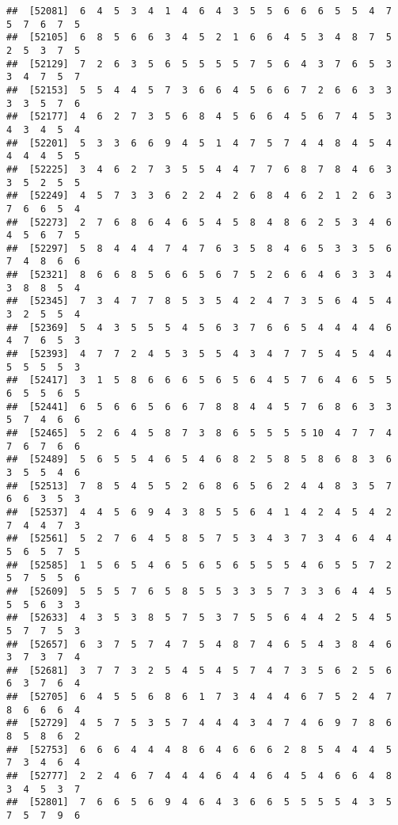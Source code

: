 \documentclass[
]{book}
\begin{document}
\begin{verbatim}
##  [52081]  6  4  5  3  4  1  4  6  4  3  5  5  6  6  6  5  5  4  7  5  7  6  7  5
##  [52105]  6  8  5  6  6  3  4  5  2  1  6  6  4  5  3  4  8  7  5  2  5  3  7  5
##  [52129]  7  2  6  3  5  6  5  5  5  5  7  5  6  4  3  7  6  5  3  3  4  7  5  7
##  [52153]  5  5  4  4  5  7  3  6  6  4  5  6  6  7  2  6  6  3  3  3  3  5  7  6
##  [52177]  4  6  2  7  3  5  6  8  4  5  6  6  4  5  6  7  4  5  3  4  3  4  5  4
##  [52201]  5  3  3  6  6  9  4  5  1  4  7  5  7  4  4  8  4  5  4  4  4  4  5  5
##  [52225]  3  4  6  2  7  3  5  5  4  4  7  7  6  8  7  8  4  6  3  3  5  2  5  5
##  [52249]  4  5  7  3  3  6  2  2  4  2  6  8  4  6  2  1  2  6  3  7  6  6  5  4
##  [52273]  2  7  6  8  6  4  6  5  4  5  8  4  8  6  2  5  3  4  6  4  5  6  7  5
##  [52297]  5  8  4  4  4  7  4  7  6  3  5  8  4  6  5  3  3  5  6  7  4  8  6  6
##  [52321]  8  6  6  8  5  6  6  5  6  7  5  2  6  6  4  6  3  3  4  3  8  8  5  4
##  [52345]  7  3  4  7  7  8  5  3  5  4  2  4  7  3  5  6  4  5  4  3  2  5  5  4
##  [52369]  5  4  3  5  5  5  4  5  6  3  7  6  6  5  4  4  4  4  6  4  7  6  5  3
##  [52393]  4  7  7  2  4  5  3  5  5  4  3  4  7  7  5  4  5  4  4  5  5  5  5  3
##  [52417]  3  1  5  8  6  6  6  5  6  5  6  4  5  7  6  4  6  5  5  6  5  5  6  5
##  [52441]  6  5  6  6  5  6  6  7  8  8  4  4  5  7  6  8  6  3  3  5  7  4  6  6
##  [52465]  5  2  6  4  5  8  7  3  8  6  5  5  5  5 10  4  7  7  4  7  6  7  6  6
##  [52489]  5  6  5  5  4  6  5  4  6  8  2  5  8  5  8  6  8  3  6  3  5  5  4  6
##  [52513]  7  8  5  4  5  5  2  6  8  6  5  6  2  4  4  8  3  5  7  6  6  3  5  3
##  [52537]  4  4  5  6  9  4  3  8  5  5  6  4  1  4  2  4  5  4  2  7  4  4  7  3
##  [52561]  5  2  7  6  4  5  8  5  7  5  3  4  3  7  3  4  6  4  4  5  6  5  7  5
##  [52585]  1  5  6  5  4  6  5  6  5  6  5  5  5  4  6  5  5  7  2  5  7  5  5  6
##  [52609]  5  5  5  7  6  5  8  5  5  3  3  5  7  3  3  6  4  4  5  5  5  6  3  3
##  [52633]  4  3  5  3  8  5  7  5  3  7  5  5  6  4  4  2  5  4  5  5  7  7  5  3
##  [52657]  6  3  7  5  7  4  7  5  4  8  7  4  6  5  4  3  8  4  6  3  7  3  7  4
##  [52681]  3  7  7  3  2  5  4  5  4  5  7  4  7  3  5  6  2  5  6  6  3  7  6  4
##  [52705]  6  4  5  5  6  8  6  1  7  3  4  4  4  6  7  5  2  4  7  8  6  6  6  4
##  [52729]  4  5  7  5  3  5  7  4  4  4  3  4  7  4  6  9  7  8  6  8  5  8  6  2
##  [52753]  6  6  6  4  4  4  8  6  4  6  6  6  2  8  5  4  4  4  5  7  3  4  6  4
##  [52777]  2  2  4  6  7  4  4  4  6  4  4  6  4  5  4  6  6  4  8  3  4  5  3  7
##  [52801]  7  6  6  5  6  9  4  6  4  3  6  6  5  5  5  5  4  3  5  7  5  7  9  6

\end{verbatim}
\end{document}
